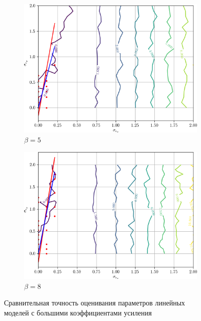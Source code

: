 \begin{figure}[p]
  \begin{subfigure}[b]{\linewidth}
    \centering
    \includegraphics[width=135mm]{fig/linear/param/beta-5_param-accs-approx.png}
    \caption{\( \beta = 5 \)}
  \end{subfigure}

  \vspace{2\baselineskip}
  \begin{subfigure}[b]{\linewidth}
    \centering
    \includegraphics[width=135mm]{fig/linear/param/beta-8_param-accs-approx.png}
    \caption{\( \beta = 8 \)}
  \end{subfigure}

  \vspace{\baselineskip}
  \caption{%
    Сравнительная точность оценивания параметров линейных \\
    моделей с большими коэффициентами усиления
  }\label{fig:comparison_linear_params_beta-big}
\end{figure}

